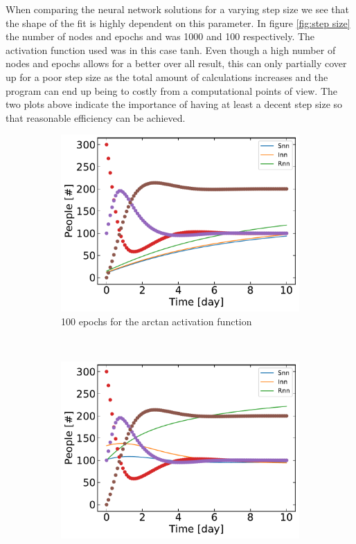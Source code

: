  	When comparing the neural network solutions for a varying step size we see that the shape of the fit is highly dependent on this parameter. In figure \ref{fig:step size} the number of nodes and epochs and was 1000 and 100 respectively. The activation function used was in this case tanh. Even though a high number of nodes and epochs allows for a better over all result, this can only partially cover up for a poor step size as the total amount of calculations increases and the program can end up being to costly from a computational points of view. The two plots above indicate the importance of having at least a decent step size so that reasonable efficiency can be achieved.

	 \begin{figure}[H]
	\centering
	\begin{subfigure}{0.5\textwidth}
		\centering
		\includegraphics[width=\linewidth]{result/Resultater_supervised/arctan_1000_100_0001.pdf}
		\caption{100 epochs for the arctan activation function}
	\end{subfigure}%
	~ 
	\begin{subfigure}{0.5\textwidth}
		\centering
		\includegraphics[width=\linewidth]{result/Resultater_supervised/arctan_1000_1000_0001.pdf}

\end{subfigure}
\end{figure}
